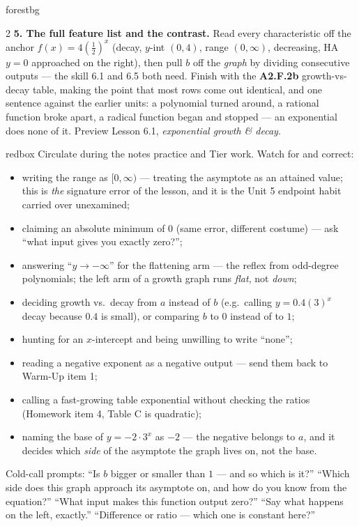 \documentclass[10pt]{article}
\begin{document}
\begin{skillbox}[Lesson]{forestbg}
\begin{multicols}{2}
\textbf{5. The full feature list and the contrast.} Read every characteristic off the anchor
$f(x)=4\left(\frac12\right)^{x}$ (decay, $y$-int $(0,4)$, range $(0,\infty)$, decreasing, HA $y=0$
approached on the right), then pull $b$ off the \emph{graph} by dividing consecutive outputs ---
the skill 6.1 and 6.5 both need. Finish with the \textbf{A2.F.2b} growth-vs-decay table, making the
point that most rows come out identical, and one sentence against the earlier units: a polynomial
turned around, a rational function broke apart, a radical function began and stopped --- an
exponential does none of it. Preview Lesson 6.1, \emph{exponential growth \& decay}.
\end{multicols}
\end{skillbox}

\begin{skillbox}{redbox}
Circulate during the notes practice and Tier work. Watch for and correct:
\begin{itemize}[leftmargin=1.2em, nosep]
  \item writing the range as $[0,\infty)$ --- treating the asymptote as an attained value; this is \emph{the} signature error of the lesson, and it is the Unit 5 endpoint habit carried over unexamined;
  \item claiming an absolute minimum of $0$ (same error, different costume) --- ask ``what input gives you exactly zero?'';
  \item answering ``$y\to-\infty$'' for the flattening arm --- the reflex from odd-degree polynomials; the left arm of a growth graph runs \emph{flat}, not \emph{down};
  \item deciding growth vs.\ decay from $a$ instead of $b$ (e.g.\ calling $y=0.4(3)^{x}$ decay because $0.4$ is small), or comparing $b$ to $0$ instead of to $1$;
  \item hunting for an $x$-intercept and being unwilling to write ``none'';
  \item reading a negative exponent as a negative output --- send them back to Warm-Up item 1;
  \item calling a fast-growing table exponential without checking the ratios (Homework item 4, Table C is quadratic);
  \item naming the base of $y=-2\cdot3^{x}$ as $-2$ --- the negative belongs to $a$, and it decides which \emph{side} of the asymptote the graph lives on, not the base.
\end{itemize}
Cold-call prompts: ``Is $b$ bigger or smaller than $1$ --- and so which is it?'' ``Which side does
this graph approach its asymptote on, and how do you know from the equation?'' ``What input makes
this function output zero?'' ``Say what happens on the left, exactly.'' ``Difference or ratio ---
which one is constant here?''
\end{skillbox}
\end{document}
